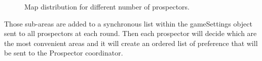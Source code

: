 \begin{figure}[H]
	\centering
	\caption{Map distribution for different number of prospectors.}
	\label{fig:map_division}
\end{figure}


Those sub-areas are added to a synchronous list within the gameSettings object sent to all prospectors at each round. Then each prospector will decide which are the most convenient areas and it will create an ordered list of preference that will be sent to the Prospector coordinator. 

